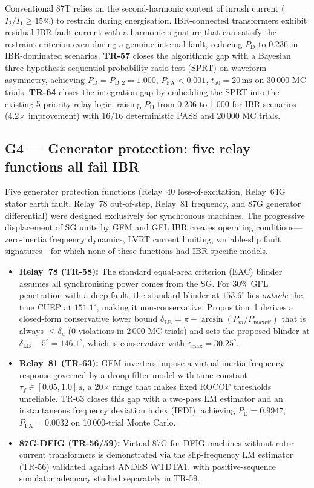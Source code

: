 \documentclass
    [phd,synopsis]
    {iitmdissertation}
\newcommand{\ms}{\,\text{ms}}
\newcommand{\PD}{P_{\mathrm{D}}}
\newcommand{\PFA}{P_{\mathrm{FA}}}
\newcommand{\dLB}{\delta_{\mathrm{LB}}}
\begin{document}
Conventional 87T relies on the second-harmonic content of inrush current
($I_2/I_1 \geq 15\%$) to restrain during energisation.
IBR-connected transformers exhibit residual IBR fault current with a
harmonic signature that can satisfy the restraint criterion even during a
genuine internal fault, reducing $\PD$ to 0.236 in IBR-dominated scenarios.
\textbf{TR-57} closes the algorithmic gap with a Bayesian three-hypothesis
sequential probability ratio test (SPRT) on waveform asymmetry, achieving
$\PD = P_{\mathrm{D},2} = 1.000$, $\PFA < 0.001$, $t_{50} = 20\ms$ on 30\,000 MC trials.
\textbf{TR-64} closes the integration gap by embedding the SPRT into the
existing 5-priority relay logic, raising $\PD$ from 0.236 to 1.000 for
IBR scenarios (4.2$\times$ improvement) with 16/16 deterministic PASS and
20\,000 MC trials.

\subsection*{G4 — Generator protection: five relay functions all fail IBR}

Five generator protection functions (Relay~40 loss-of-excitation,
Relay~64G stator earth fault, Relay~78 out-of-step, Relay~81 frequency,
and 87G generator differential) were designed exclusively for synchronous
machines.
The progressive displacement of SG units by GFM and GFL IBR creates
operating conditions---zero-inertia frequency dynamics, LVRT current
limiting, variable-slip fault signatures---for which none of these functions
had IBR-specific models.

\begin{itemize}
  \item \textbf{Relay~78 (TR-58):} The standard equal-area criterion (EAC)
    blinder assumes all synchronising power comes from the SG.
    For 30\% GFL penetration with a deep fault, the standard blinder at
    $153.6^\circ$ lies \emph{outside} the true CUEP at $151.1^\circ$,
    making it non-conservative.
    Proposition~1 derives a closed-form conservative lower bound
    $\dLB = \pi - \arcsin(P_m / P_{\mathrm{maxeff}})$ that is always
    $\leq \delta_u$ (0 violations in 2\,000 MC trials) and sets the
    proposed blinder at $\dLB - 5^\circ = 146.1^\circ$, which is
    conservative with $\varepsilon_{\max} = 30.25^\circ$.

  \item \textbf{Relay~81 (TR-63):} GFM inverters impose a virtual-inertia
    frequency response governed by a droop-filter model with time constant
    $\tau_f \in [0.05, 1.0]\,\text{s}$, a 20$\times$ range that makes fixed
    ROCOF thresholds unreliable.
    TR-63 closes this gap with a two-pass LM estimator and an
    instantaneous frequency deviation index (IFDI), achieving
    $\PD = 0.9947$, $\PFA = 0.0032$ on 10\,000-trial Monte Carlo.

  \item \textbf{87G-DFIG (TR-56/59):} Virtual 87G for DFIG machines
    without rotor current transformers is demonstrated via the
    slip-frequency LM estimator (TR-56) validated against ANDES WTDTA1,
    with positive-sequence simulator adequacy studied separately in TR-59.
\end{itemize}
\end{document}
